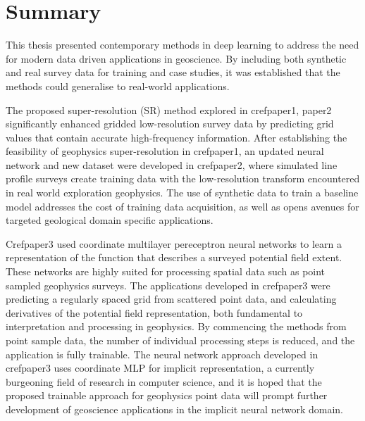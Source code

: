 \documentclass[manuscript.tex]{subfiles}
\begin{document}



\section{Summary}
This thesis presented contemporary methods in deep learning to address the need for modern data driven applications in geoscience.
By including both synthetic and real survey data for training and case studies, it was established that the methods could generalise to real-world applications.

The proposed super-resolution (SR) method explored in cref{paper1, paper2} significantly enhanced gridded low-resolution survey data by predicting grid values that contain accurate high-frequency information.
After establishing the feasibility of geophysics super-resolution in cref{paper1}, an updated neural network and new dataset were developed in cref{paper2}, where simulated line profile surveys create training data with the low-resolution transform encountered in real world exploration geophysics.
The use of synthetic data to train a baseline model addresses the cost of training data acquisition, as well as opens avenues for targeted geological domain specific applications.

Cref{paper3} used coordinate multilayer pereceptron neural networks to learn a representation of the function that describes a surveyed potential field extent.
These networks are highly suited for processing spatial data such as point sampled geophysics surveys.
The applications developed in cref{paper3} were predicting a regularly spaced grid from scattered point data, and calculating derivatives of the potential field representation, both fundamental to interpretation and processing in geophysics.
By commencing the methods from point sample data, the number of individual processing steps is reduced, and the application is fully trainable.
The neural network approach developed in cref{paper3} uses coordinate MLP for implicit representation, a currently burgeoning field of research in computer science, and it is hoped that the proposed trainable approach for geophysics point data will prompt further development of geoscience applications in the implicit neural network domain.
\end{document}

